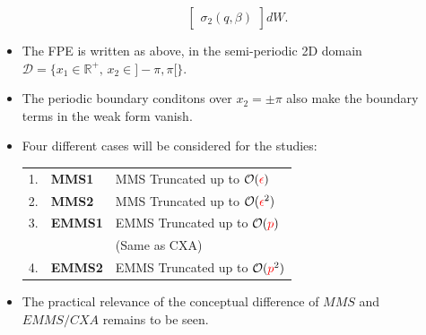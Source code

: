 \documentclass[11pt]{article}
\begin{document}
\begin{itemize}
$$\begin{bmatrix}
      \sigma_2(q,\beta)\end{bmatrix} dW. $$
\item The FPE is written as above, in the semi-periodic 2D domain \(\mathcal{D}=\{x_1\in\mathbb{R}^+,\, x_2\in]-\pi,\pi[\}\).
\item The periodic boundary conditons over \(x_2=\pm\pi\) also make the boundary terms in the weak form vanish.
\item Four different cases will be considered for the studies:
\begin{center}
\begin{tabular}{rll}
\hline
1. & \textbf{MMS1} & MMS Truncated up to \(\mathcal{O}(\textcolor{red}{\epsilon})\)\\[0pt]
2. & \textbf{MMS2} & MMS Truncated up to \(\mathcal{O}(\textcolor{red}{\epsilon}^2)\)\\[0pt]
3. & \textbf{EMMS1} & EMMS Truncated up to \(\mathcal{O}(\textcolor{red}{p})\)\\[0pt]
 &  & (Same as CXA)\\[0pt]
4. & \textbf{EMMS2} & EMMS Truncated up to \(\mathcal{O}(\textcolor{red}{p}^2)\)\\[0pt]
\hline
\end{tabular}
\end{center}
\item The practical relevance of the conceptual difference of \(MMS\) and \(EMMS/CXA\) remains to be seen.
\end{itemize}
\end{document}
